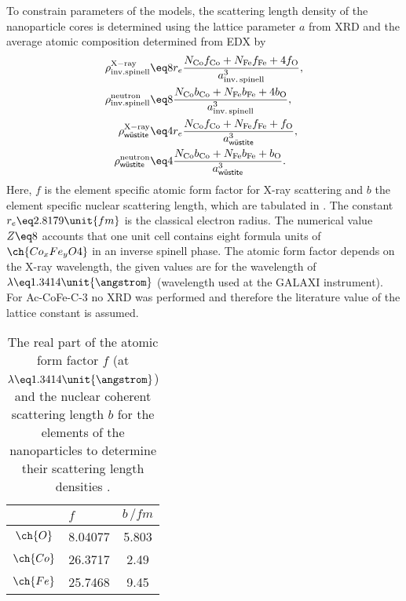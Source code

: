 \documentclass[\main/dresen_thesis.tex]{subfiles}
\begin{document}
    To constrain parameters of the models, the scattering length density of the nanoparticle cores is determined using the lattice parameter $a$ from XRD and the average atomic composition determined from EDX by
    \begin{align}
      \label{eq:monolayer:charMethod:calcSLD}
      \rho^\mathrm{X-ray}_\mathrm{inv. spinell}   &\eq 8 r_e \frac{N_\mathrm{Co} f_\mathrm{Co} + N_\mathrm{Fe} f_\mathrm{Fe} + 4 f_\mathrm{O}}
                                                                  {a_\mathrm{inv.\,spinell}^3},\\
      \rho^\mathrm{neutron}_\mathrm{inv. spinell} &\eq 8 \frac{N_\mathrm{Co} b_\mathrm{Co} + N_\mathrm{Fe} b_\mathrm{Fe} + 4 b_\mathrm{O}}
                                                                  {a_\mathrm{inv.\,spinell}^3},\\
      \rho^\mathrm{X-ray}_\textsf{w\"ustite}      &\eq 4 r_e \frac{N_\mathrm{Co} f_\mathrm{Co} + N_\mathrm{Fe} f_\mathrm{Fe} + f_\mathrm{O}}
                                                                  {a_\textsf{w\"ustite}^3},\\
      \rho^\mathrm{neutron}_\textsf{w\"ustite}    &\eq 4 \frac{N_\mathrm{Co} b_\mathrm{Co} + N_\mathrm{Fe} b_\mathrm{Fe} + b_\mathrm{O}}
                                                              {a_\textsf{w\"ustite}^3}.
    \end{align}
    Here, $f$ is the element specific atomic form factor for X-ray scattering and $b$ the element specific nuclear scattering length, which are  tabulated in  \cite{Sears_1992_Neutr, BerkeleyLab_1993_asf}.
    The constant $r_e \eq 2.8179 \unit{fm}$ is the classical electron radius.
    The numerical value $Z \eq 8$ accounts that one unit cell contains eight formula units of $\ch{Co_xFe_yO4}$ in an inverse spinell phase.
    The atomic form factor depends on the X-ray wavelength, the given values are for the wavelength of $\lambda \eq 1.3414 \unit{\angstrom}$ (wavelength used at the GALAXI instrument).
    For Ac-CoFe-C-3 no XRD was performed and therefore the literature value of the lattice constant is assumed.
    \begin{table}[ht]
      \centering
      \caption{\label{tab:monolayers:charMethod:scatteringLenghts}The real part of the atomic form factor $f$ (at $\lambda \eq 1.3414 \unit{\angstrom}$) and the nuclear coherent scattering length $b$ for the elements of the nanoparticles to determine their scattering length densities \cite{Sears_1992_Neutr, BerkeleyLab_1993_asf}.}
      \begin{tabular}{ c | l | c }
                  & $f$       & $b \, / \unit{fm}$ \\
        \hline
        $\ch{O}$  & 8.04077   & 5.803   \\
        $\ch{Co}$ & 26.3717   & 2.49  \\
        $\ch{Fe}$ & 25.7468   & 9.45  \\
        \hline
      \end{tabular}
    \end{table}
\end{document}
